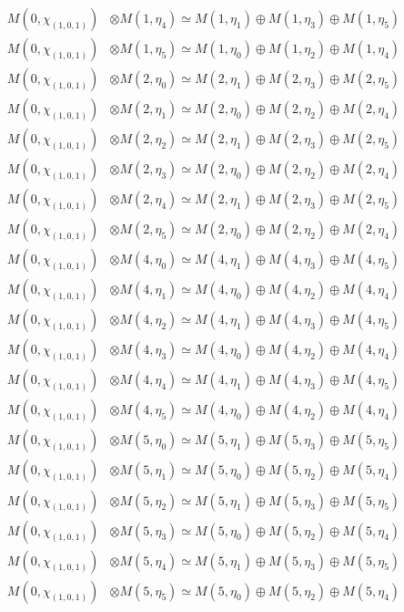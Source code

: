 \begin{align*}
M(0,\chi_{(1,0,1)}) &\otimes M(1,\eta_{4}) \simeq M(1,\eta_{1}) \oplus M(1,\eta_{3}) \oplus M(1,\eta_{5}) \\
M(0,\chi_{(1,0,1)}) &\otimes M(1,\eta_{5}) \simeq M(1,\eta_{0}) \oplus M(1,\eta_{2}) \oplus M(1,\eta_{4}) \\
M(0,\chi_{(1,0,1)}) &\otimes M(2,\eta_{0}) \simeq M(2,\eta_{1}) \oplus M(2,\eta_{3}) \oplus M(2,\eta_{5}) \\
M(0,\chi_{(1,0,1)}) &\otimes M(2,\eta_{1}) \simeq M(2,\eta_{0}) \oplus M(2,\eta_{2}) \oplus M(2,\eta_{4}) \\
M(0,\chi_{(1,0,1)}) &\otimes M(2,\eta_{2}) \simeq M(2,\eta_{1}) \oplus M(2,\eta_{3}) \oplus M(2,\eta_{5}) \\
M(0,\chi_{(1,0,1)}) &\otimes M(2,\eta_{3}) \simeq M(2,\eta_{0}) \oplus M(2,\eta_{2}) \oplus M(2,\eta_{4}) \\
M(0,\chi_{(1,0,1)}) &\otimes M(2,\eta_{4}) \simeq M(2,\eta_{1}) \oplus M(2,\eta_{3}) \oplus M(2,\eta_{5}) \\
M(0,\chi_{(1,0,1)}) &\otimes M(2,\eta_{5}) \simeq M(2,\eta_{0}) \oplus M(2,\eta_{2}) \oplus M(2,\eta_{4}) \\
M(0,\chi_{(1,0,1)}) &\otimes M(4,\eta_{0}) \simeq M(4,\eta_{1}) \oplus M(4,\eta_{3}) \oplus M(4,\eta_{5}) \\
M(0,\chi_{(1,0,1)}) &\otimes M(4,\eta_{1}) \simeq M(4,\eta_{0}) \oplus M(4,\eta_{2}) \oplus M(4,\eta_{4}) \\
M(0,\chi_{(1,0,1)}) &\otimes M(4,\eta_{2}) \simeq M(4,\eta_{1}) \oplus M(4,\eta_{3}) \oplus M(4,\eta_{5}) \\
M(0,\chi_{(1,0,1)}) &\otimes M(4,\eta_{3}) \simeq M(4,\eta_{0}) \oplus M(4,\eta_{2}) \oplus M(4,\eta_{4}) \\
M(0,\chi_{(1,0,1)}) &\otimes M(4,\eta_{4}) \simeq M(4,\eta_{1}) \oplus M(4,\eta_{3}) \oplus M(4,\eta_{5}) \\
M(0,\chi_{(1,0,1)}) &\otimes M(4,\eta_{5}) \simeq M(4,\eta_{0}) \oplus M(4,\eta_{2}) \oplus M(4,\eta_{4}) \\
M(0,\chi_{(1,0,1)}) &\otimes M(5,\eta_{0}) \simeq M(5,\eta_{1}) \oplus M(5,\eta_{3}) \oplus M(5,\eta_{5}) \\
M(0,\chi_{(1,0,1)}) &\otimes M(5,\eta_{1}) \simeq M(5,\eta_{0}) \oplus M(5,\eta_{2}) \oplus M(5,\eta_{4}) \\
M(0,\chi_{(1,0,1)}) &\otimes M(5,\eta_{2}) \simeq M(5,\eta_{1}) \oplus M(5,\eta_{3}) \oplus M(5,\eta_{5}) \\
M(0,\chi_{(1,0,1)}) &\otimes M(5,\eta_{3}) \simeq M(5,\eta_{0}) \oplus M(5,\eta_{2}) \oplus M(5,\eta_{4}) \\
M(0,\chi_{(1,0,1)}) &\otimes M(5,\eta_{4}) \simeq M(5,\eta_{1}) \oplus M(5,\eta_{3}) \oplus M(5,\eta_{5}) \\
M(0,\chi_{(1,0,1)}) &\otimes M(5,\eta_{5}) \simeq M(5,\eta_{0}) \oplus M(5,\eta_{2}) \oplus M(5,\eta_{4}) \\
\end{align*}

